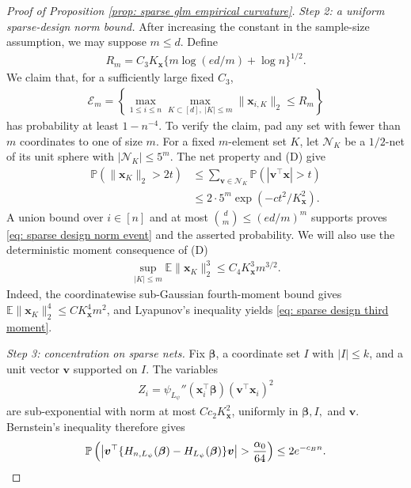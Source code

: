 \documentclass[letterpaper,12pt]{article}
\numberwithin{equation}{section}
\theoremstyle{plain}
\numberwithin{Theorem}{section}
\numberwithin{proposition}{section}
\numberwithin{Lemma}{section}
{
	\theoremstyle{definition}
	\newtheorem{Definition}{Definition}
	\newtheorem{example}{Example}
	\numberwithin{example}{section}
	\newtheorem{fact}{Fact}
	\numberwithin{fact}{section}
	\newtheorem{remark}{Remark}
}
\newcommand{\1}{\mathbbm{1}}
\def\bbeta{{\boldsymbol{\beta}}}
\def\Pr{\mathbb P}
\def\E{\mathbb{E}}
\begin{document}
\begin{proof}[Proof of Proposition \ref{prop: sparse glm empirical curvature}]
\textit{Step 2: a uniform sparse-design norm bound.}
After increasing the constant in the sample-size assumption, we may
suppose $m\leq d$.  Define
\begin{align*}
R_m=C_3K_{\bm x}
\{m\log(ed/m)+\log n\}^{1/2}.
\end{align*}
We claim that, for a sufficiently large fixed $C_3$,
\begin{align}
\mathcal E_m=
\left\{\max_{1\leq i\leq n}\max_{K\subset[d],\ |K|\leq m}
\|\bm x_{i,K}\|_2\leq R_m\right\}                         \label{eq: sparse design norm event}
\end{align}
has probability at least $1-n^{-4}$.  To verify the claim, pad any set
with fewer than $m$ coordinates to one of size $m$.  For a fixed
$m$-element set $K$, let $\mathcal N_K$ be a $1/2$-net of its unit
sphere with $|\mathcal N_K|\leq5^m$.  The net property and (D) give
\begin{align*}
\Pr(\|\bm x_K\|_2>2t)
&\leq\sum_{\bm v\in\mathcal N_K}
\Pr(|\bm v^\top\bm x|>t)\\
&\leq2\cdot5^m\exp(-ct^2/K_{\bm x}^2).
\end{align*}
A union bound over $i\in[n]$ and at most
$\binom dm\leq(ed/m)^m$ supports proves
\eqref{eq: sparse design norm event} and the asserted probability.
We will also use the deterministic moment consequence of (D)
\begin{align}
\sup_{|K|\leq m}\E\|\bm x_K\|_2^3
\leq C_4K_{\bm x}^3m^{3/2}.                                 \label{eq: sparse design third moment}
\end{align}
Indeed, the coordinatewise sub-Gaussian fourth-moment bound gives
$\E\|\bm x_K\|_2^4\leq C K_{\bm x}^4m^2$, and Lyapunov's
inequality yields \eqref{eq: sparse design third moment}.

\textit{Step 3: concentration on sparse nets.}
Fix $\bbeta$, a coordinate set $I$ with $|I|\leq k$, and a unit vector
$\bm v$ supported on $I$.  The variables
\begin{align*}
Z_i=\psi_{L_\psi}''(\bm x_i^\top\bbeta)(\bm v^\top\bm x_i)^2
\end{align*}
are sub-exponential with norm at most $C c_2K_{\bm x}^2$, uniformly in
$\bbeta,I,$ and $\bm v$.  Bernstein's inequality therefore gives
\begin{align}
\Pr\left(\left|\bm v^\top
\{H_{n,L_\psi}(\bbeta)-H_{L_\psi}(\bbeta)\}\bm v\right|>\frac{\alpha_0}{64}\right)
\leq2e^{-c_{\rm B}n}.                                        \label{eq: sparse fixed hessian concentration}
\end{align}


\end{proof}
\end{document}
